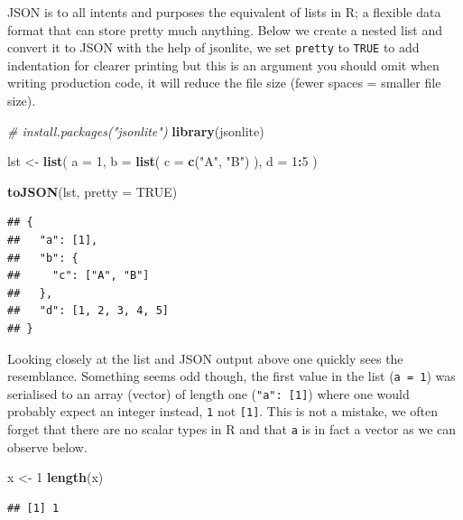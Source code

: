 \documentclass[
]{krantz}
\makeatletter
\newenvironment{Shaded}{\begin{snugshade}}{\end{snugshade}}
\newcommand{\CommentTok}[1]{\textcolor[rgb]{0.37,0.37,0.37}{\textit{#1}}}
\newcommand{\DataTypeTok}[1]{\textcolor[rgb]{0.27,0.27,0.27}{#1}}
\newcommand{\DecValTok}[1]{\textcolor[rgb]{0.06,0.06,0.06}{#1}}
\newcommand{\KeywordTok}[1]{\textcolor[rgb]{0.27,0.27,0.27}{\textbf{#1}}}
\newcommand{\NormalTok}[1]{#1}
\newcommand{\OperatorTok}[1]{\textcolor[rgb]{0.43,0.43,0.43}{\textbf{#1}}}
\newcommand{\OtherTok}[1]{\textcolor[rgb]{0.37,0.37,0.37}{#1}}
\newcommand{\StringTok}[1]{\textcolor[rgb]{0.5,0.5,0.5}{#1}}
\newenvironment{kframe}{%
\medskip{}
\setlength{\fboxsep}{.8em}
 \def\at@end@of@kframe{}%
 \ifinner\ifhmode%
  \def\at@end@of@kframe{\end{minipage}}%
  \begin{minipage}{\columnwidth}%
 \fi\fi%
 \def\FrameCommand##1{\hskip\@totalleftmargin \hskip-\fboxsep
 \colorbox{shadecolor}{##1}\hskip-\fboxsep
     \hskip-\linewidth \hskip-\@totalleftmargin \hskip\columnwidth}%
 \MakeFramed {\advance\hsize-\width
   \@totalleftmargin\z@ \linewidth\hsize
   \@setminipage}}%
 {\par\unskip\endMakeFramed%
 \at@end@of@kframe}
\renewenvironment{Shaded}{\begin{kframe}}{\end{kframe}}
\makeatother
\begin{document}
JSON is to all intents and purposes the equivalent of lists in R; a flexible data format that can store pretty much anything. Below we create a nested list and convert it to JSON with the help of jsonlite, we set \texttt{pretty} to \texttt{TRUE} to add indentation for clearer printing but this is an argument you should omit when writing production code, it will reduce the file size (fewer spaces = smaller file size).

\begin{Shaded}
\begin{Highlighting}[]
\CommentTok{\# install.packages("jsonlite")}
\KeywordTok{library}\NormalTok{(jsonlite)}

\NormalTok{lst \textless{}{-}}\StringTok{ }\KeywordTok{list}\NormalTok{(}
  \DataTypeTok{a =} \DecValTok{1}\NormalTok{,}
  \DataTypeTok{b =} \KeywordTok{list}\NormalTok{(}
    \DataTypeTok{c =} \KeywordTok{c}\NormalTok{(}\StringTok{"A"}\NormalTok{, }\StringTok{"B"}\NormalTok{)}
\NormalTok{  ),}
  \DataTypeTok{d =} \DecValTok{1}\OperatorTok{:}\DecValTok{5}
\NormalTok{)}

\KeywordTok{toJSON}\NormalTok{(lst, }\DataTypeTok{pretty =} \OtherTok{TRUE}\NormalTok{)}
\end{Highlighting}
\end{Shaded}

\begin{verbatim}
## {
##   "a": [1],
##   "b": {
##     "c": ["A", "B"]
##   },
##   "d": [1, 2, 3, 4, 5]
## }
\end{verbatim}

Looking closely at the list and JSON output above one quickly sees the resemblance. Something seems odd though, the first value in the list (\texttt{a\ =\ 1}) was serialised to an array (vector) of length one (\texttt{"a":\ {[}1{]}}) where one would probably expect an integer instead, \texttt{1} not \texttt{{[}1{]}}. This is not a mistake, we often forget that there are no scalar types in R and that \texttt{a} is in fact a vector as we can observe below.

\begin{Shaded}
\begin{Highlighting}[]
\NormalTok{x \textless{}{-}}\StringTok{ }\DecValTok{1}
\KeywordTok{length}\NormalTok{(x)}
\end{Highlighting}
\end{Shaded}

\begin{verbatim}
## [1] 1
\end{verbatim}
\end{document}

